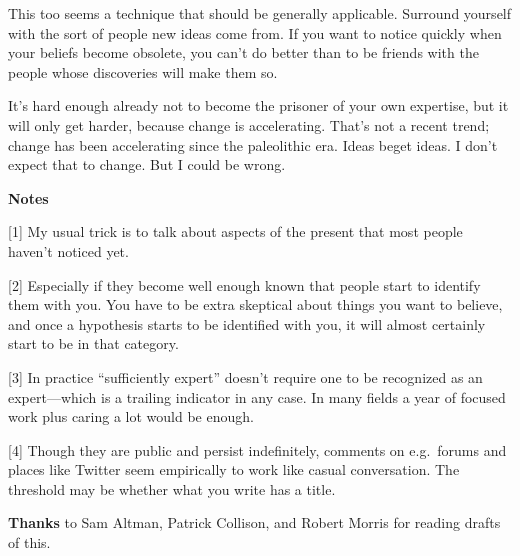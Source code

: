 This too seems a technique that should be generally applicable. Surround
yourself with the sort of people new ideas come from. If you want to
notice quickly when your beliefs become obsolete, you can't do better
than to be friends with the people whose discoveries will make them so.

It's hard enough already not to become the prisoner of your own
expertise, but it will only get harder, because change is accelerating.
That's not a recent trend; change has been accelerating since the
paleolithic era. Ideas beget ideas. I don't expect that to change. But I
could be wrong.

\textbf{Notes}

{[}1{]} My usual trick is to talk about aspects of the present that most
people haven't noticed yet.

{[}2{]} Especially if they become well enough known that people start to
identify them with you. You have to be extra skeptical about things you
want to believe, and once a hypothesis starts to be identified with you,
it will almost certainly start to be in that category.

{[}3{]} In practice ``sufficiently expert'' doesn't require one to be
recognized as an expert---which is a trailing indicator in any case. In
many fields a year of focused work plus caring a lot would be enough.

{[}4{]} Though they are public and persist indefinitely, comments on
e.g.~forums and places like Twitter seem empirically to work like casual
conversation. The threshold may be whether what you write has a title.

\textbf{Thanks} to Sam Altman, Patrick Collison, and Robert Morris for
reading drafts of this.
